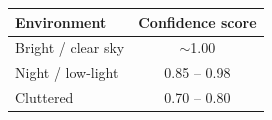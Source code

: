 \documentclass[border=10pt]{standalone}
\begin{document}
\begin{tabular}{lc}
\toprule
\textbf{Environment} & \textbf{Confidence score} \\
\midrule
Bright / clear sky    & $\sim$1.00 \\
Night / low-light     & 0.85 -- 0.98 \\
Cluttered             & 0.70 -- 0.80 \\
\bottomrule
\end{tabular}
\end{document}
